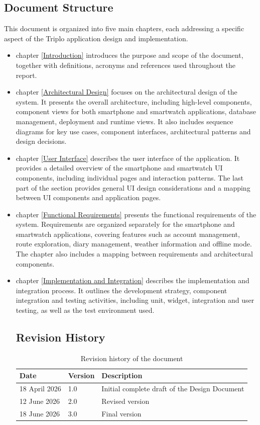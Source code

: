 \newpage
\subsection{Document Structure}

This document is organized into five main chapters, each addressing a specific aspect of the Triplo application design and implementation.
\begin{itemize}
\item chapter \ref{Introduction} introduces the purpose and scope of the document, together with definitions, acronyms and references used throughout the report.
\item chapter \ref{Architectural Design} focuses on the architectural design of the system. It presents the overall architecture, including high-level components, component views for both smartphone and smartwatch applications, database management, deployment and runtime views. It also includes sequence diagrams for key use cases, component interfaces, architectural patterns and design decisions.
\item chapter \ref{User Interface} describes the user interface of the application. It provides a detailed overview of the smartphone and smartwatch UI components, including individual pages and interaction patterns. The last part of the section provides general UI design considerations and a mapping between UI components and application pages.
\item chapter \ref{Functional Requirements} presents the functional requirements of the system. Requirements are organized separately for the smartphone and smartwatch applications, covering features such as account management, route exploration, diary management, weather information and offline mode. The chapter also includes a mapping between requirements and architectural components.
\item chapter \ref{Implementation and Integration} describes the implementation and integration process. It outlines the development strategy, component integration and testing activities, including unit, widget, integration and user testing, as well as the test environment used.



\subsection{Revision History}
\begin{table}[h]
\centering
\begin{tabular}{|l|l|p{9cm}|}
\hline
\textbf{Date} & \textbf{Version} & \textbf{Description} \\
\hline
18 April 2026 & 1.0 & Initial complete draft of the Design Document \\
12 June 2026 & 2.0 & Revised version \\
18 June 2026 & 3.0 & Final version \\
\hline
\end{tabular}
\caption{Revision history of the document}
\end{table}


\end{itemize}


